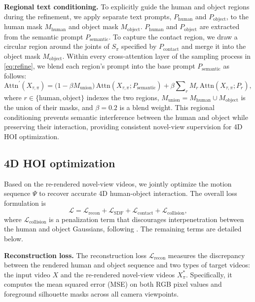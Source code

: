 \noindent\textbf{Regional text conditioning.}
To explicitly guide the human and object regions during the refinement, we apply separate text prompts, $P_{\text{human}}$ and $P_{\text{object}}$, to the human mask $M_{\text{human}}$ and object mask $M_{\text{object}}$.
$P_{\text{human}}$ and $P_{\text{object}}$ are extracted from the semantic prompt $P_{\text{semantic}}$.
To capture the contact region, we draw a circular region around the joints of $S_{\pi}$ specified by $P_{\text{contact}}$ and merge it into the object mask $M_{\text{object}}$.
Within every cross-attention layer of the sampling process in \cref{eq:refine}, we blend each region's prompt into the base prompt $P_{\text{semantic}}$ as follows:
\begin{equation}
\text{Attn}^\prime(X_{\tau,\pi}) = \big(1-\beta M_{\text{union}}\big)\,\text{Attn}(X_{\tau,\pi}; P_{\text{semantic}}) + \beta \sum\nolimits_{r} M_r\,\text{Attn}(X_{\tau,\pi}; P_r),
\label{eq:regional_text}
\end{equation}
where $r \in \{\text{human}, \text{object}\}$ indexes the two regions, $M_{\text{union}} = M_{\text{human}} \cup M_{\text{object}}$ is the union of their masks, and $\beta = 0.2$ is a blend weight.
This regional conditioning prevents semantic interference between the human and object while preserving their interaction, providing consistent novel-view supervision for 4D HOI optimization.





\subsection{4D HOI optimization}
\label{sec:3.4_optimization}
Based on the re-rendered novel-view videos, we jointly optimize the motion sequence $\Psi$ to recover accurate 4D human-object interaction.
The overall loss formulation is
\begin{equation}
\label{eq:overall_loss}
\mathcal{L}=\mathcal{L}_{\text{recon}}+\mathcal{L}_{\text{SDF}}+\mathcal{L}_{\text{contact}}+\mathcal{L}_{\text{collision}},
\end{equation}
where $\mathcal{L}_\text{collision}$ is a penalization term that discourages interpenetration between the human and object Gaussians, following \cite{jiang2020coherent}.
The remaining terms are detailed below.


\noindent\textbf{Reconstruction loss.}
The reconstruction loss $\mathcal{L}_{\text{recon}}$ measures the discrepancy between the rendered human and object sequence and two types of target videos: the input video $X$ and the re-rendered novel-view videos $X^{*}_{\pi}$.
Specifically, it computes the mean squared error (MSE) on both RGB pixel values and foreground silhouette masks across all camera viewpoints.


